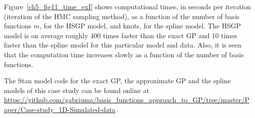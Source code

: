 \documentclass[onecolumn,a4paper,11pt]{article}
\begin{document}
Figure~\ref{ch5_fig11_time_exI} shows computational times, in seconds per iteration (iteration of the HMC sampling method), as a function of the number of basis functions $m$, for the HSGP model, and knots, for the spline model. The HSGP model is on average roughly 400 times faster than the exact GP and 10 times faster than the spline model for this particular model and data. Also, it is seen that the computation time increases slowly as a function of the number of basis functions. 

The Stan model code for the exact GP, the approximate GP and the spline models of this case study can be found online at {\small \url{ https://github.com/gabriuma/basis_functions_approach_to_GP/tree/master/Paper/Case-study_1D-Simulated-data}}\,.
%

\begin{figure}
\centering
{}

\end{figure}
\end{document}
